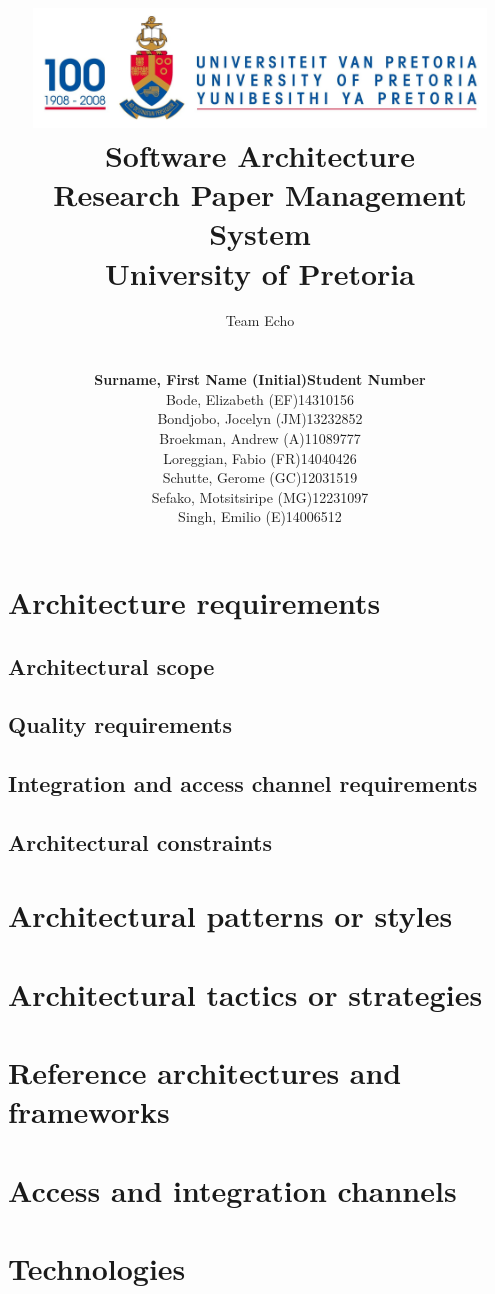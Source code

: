 \documentclass[a4paper,10pt]{article}
\title{\includegraphics[width=12cm]{Eeufeeslogo.jpg} \\
       Software Architecture \\
       Research Paper Management System \\
       \vspace{0.5cm}
       University of Pretoria \\
       \vspace{1.0cm}
       }
\date{}
\author{Team Echo\\
	\vspace{0.5cm} \\
	\begin{tabu} to \textwidth { X[l] X[l]}
		\hline
		\textbf{Surname, First Name (Initial)}	& \textbf{Student Number}	\\ \hline \hline
		Bode, Elizabeth (EF)			& 14310156		\\ \hline
		Bondjobo, Jocelyn (JM)		& 13232852		\\ \hline
		Broekman, Andrew (A)		& 11089777		\\ \hline
		Loreggian, Fabio (FR)			& 14040426		\\ \hline
		Schutte, Gerome (GC)		& 12031519		\\ \hline
		Sefako, Motsitsiripe (MG)		& 12231097		\\ \hline
		Singh, Emilio (E)			& 14006512		\\ \hline
		\hline
	\end{tabu}}
\begin{document}
\maketitle
\thispagestyle{empty}
\clearpage

\newpage
{}
\thispagestyle{empty}
\tableofcontents
\clearpage

\newpage
{}

\section{Architecture requirements}
\subsection{Architectural scope}
\subsection{Quality requirements}
\subsection{Integration and access channel requirements}
\subsection{Architectural constraints}

\section{Architectural patterns or styles}

\section{Architectural tactics or strategies}
 
\section{Reference architectures and frameworks}
 
\section{Access and integration channels}

\section{Technologies}
\end{document}
